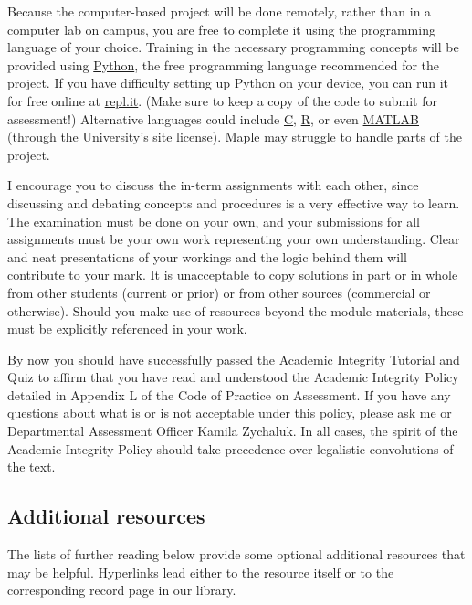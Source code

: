 \documentclass[12 pt]{article}
\begin{document}
Because the computer-based project will be done remotely, rather than in a computer lab on campus, you are free to complete it using the programming language of your choice.
Training in the necessary programming concepts will be provided using \href{https://www.python.org}{Python}, the free programming language recommended for the project.
If you have difficulty setting up Python on your device, you can run it for free online at \href{https://repl.it/languages/python3}{repl.it}.
(Make sure to keep a copy of the code to submit for assessment!)
Alternative languages could include \href{https://en.wikipedia.org/wiki/C_(programming_language)}{C}, \href{https://www.r-project.org}{R}, or even \href{https://matlab.mathworks.com}{MATLAB} (through the University's site license).
Maple may struggle to handle parts of the project.

I encourage you to discuss the in-term assignments with each other, since discussing and debating concepts and procedures is a very effective way to learn.
The examination must be done on your own, and your submissions for all assignments must be your own work representing your own understanding.
Clear and neat presentations of your workings and the logic behind them will contribute to your mark.
It is unacceptable to copy solutions in part or in whole from other students (current or prior) or from other sources (commercial or otherwise).
Should you make use of resources beyond the module materials, these must be explicitly referenced in your work.

By now you should have successfully passed the Academic Integrity Tutorial and Quiz to affirm that you have read and understood the Academic Integrity Policy detailed in Appendix L of the Code of Practice on Assessment.
If you have any questions about what is or is not acceptable under this policy, please ask me or Departmental Assessment Officer Kamila Zychaluk.
In all cases, the spirit of the Academic Integrity Policy should take precedence over legalistic convolutions of the text.



\subsection*{Additional resources}
The lists of further reading below provide some optional additional resources that may be helpful.
Hyperlinks lead either to the resource itself or to the corresponding record page in our library.
\end{document}
